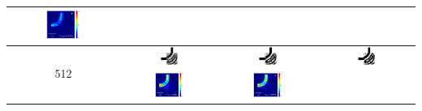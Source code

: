 \begin{table}[ht]
\begin{tabular}{|c|c|c|c|}
      \includegraphics[width=0.33\textwidth]{image/results/bend/CMA-ES/visualize_field_fab_256.png} \\
    \hline
      \multirow{2}{*}{512} &
      \includegraphics[width=0.20\textwidth]{image/results/bend/CMA-ES/visualize_eps_cont_512.png} &
      \includegraphics[width=0.20\textwidth]{image/results/bend/CMA-ES/visualize_eps_disc_512.png} &
      \includegraphics[width=0.20\textwidth]{image/results/bend/CMA-ES/visualize_eps_fab_512.png} \\
      \cline{2-4}
      &
      \includegraphics[width=0.33\textwidth]{image/results/bend/CMA-ES/visualize_field_cont_512.png} &
      \includegraphics[width=0.33\textwidth]{image/results/bend/CMA-ES/visualize_field_disc_512.png} &

\end{tabular}
\end{table}
